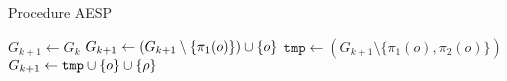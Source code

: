 \begin{algorithm}
  \caption{Procedure AESP}\label{alg:aesp}
\begin{algorithmic}%
  \State $G_{k+1} \gets G_k$
        \State $G_{k+1} \gets (G_{k+1} \setminus \{ \pi_1(o) \}) \cup \{ o \}$
      \EndIf
    \Else
      \State $\mathtt{tmp} \gets (G_{k+1} \setminus \{\pi_1(o), \pi_2(o)\})$ 
        \State $G_{k+1} \gets \mathtt{tmp} \cup \{ o \} \cup \{ \rho \}$
      \EndIf
    \EndIf
  \EndFor
\EndProcedure
\end{algorithmic}
\end{algorithm}
